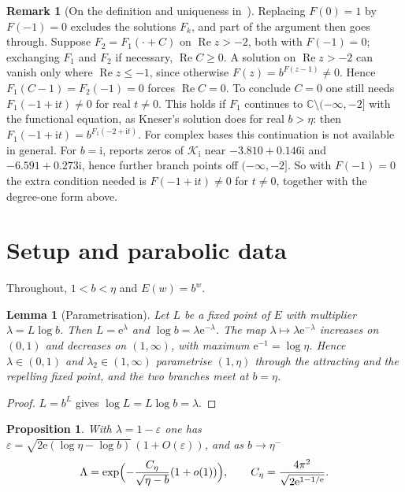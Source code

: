 \documentclass[11pt]{amsart}
\newtheorem{proposition}[theorem]{Proposition}
\newtheorem{lemma}[theorem]{Lemma}
\theoremstyle{definition}
\newtheorem{remark}[theorem]{Remark}
\newcommand{\eee}{\mathrm{e}}
\newcommand{\ii}{\mathrm{i}}
\begin{document}
\begin{remark}[On the definition and uniqueness in~\cite{Paulsen2019}]
Replacing $F(0)=1$ by $F(-1)=0$ excludes the solutions $F_k$, and part of the
argument then goes through.  Suppose $F_2=F_1(\cdot+C)$ on $\operatorname{Re}z>-2$,
both with $F(-1)=0$; exchanging $F_1$ and $F_2$ if necessary, $\operatorname{Re}C\ge0$.
A solution on $\operatorname{Re}z>-2$ can vanish only where $\operatorname{Re}z\le-1$, since otherwise
$F(z)=b^{F(z-1)}\ne0$.  Hence $F_1(C-1)=F_2(-1)=0$ forces $\operatorname{Re}C=0$.  To
conclude $C=0$ one still needs $F_1(-1+\ii t)\ne0$ for real $t\ne0$.  This holds
if $F_1$ continues to $\mathbb C\setminus(-\infty,-2]$ with the functional
equation, as Kneser's solution does for real $b>\eta$: then
$F_1(-1+\ii t)=b^{F_1(-2+\ii t)}$.  For complex bases this continuation is not
available in general.  For $b=\ii$, \cite{Paulsen2019} reports zeros of
$\mathcal K_\ii$ near $-3.810+0.146\ii$ and $-6.591+0.273\ii$, hence further branch
points off $(-\infty,-2]$.  So with $F(-1)=0$ the extra condition needed is
$F(-1+\ii t)\ne0$ for $t\ne0$, together with the degree-one form above.
\end{remark}

\section{Setup and parabolic data}\label{sec:setup}

Throughout, $1<b<\eta$ and $E(w)=b^w$.

\begin{lemma}[Parametrisation]\label{lem:param}
Let $L$ be a fixed point of $E$ with multiplier $\lambda=L\log b$.  Then
$L=\eee^\lambda$ and $\log b=\lambda\eee^{-\lambda}$.  The map
$\lambda\mapsto\lambda\eee^{-\lambda}$ increases on $(0,1)$ and decreases on
$(1,\infty)$, with maximum $\eee^{-1}=\log\eta$.  Hence $\lambda\in(0,1)$ and
$\lambda_2\in(1,\infty)$ parametrise $(1,\eta)$ through the attracting and the
repelling fixed point, and the two branches meet at $b=\eta$.
\end{lemma}

\begin{proof}
$L=b^L$ gives $\log L=L\log b=\lambda$.
\end{proof}

\begin{proposition}\label{prop:saddle}
With $\lambda=1-\varepsilon$ one has
$\varepsilon=\sqrt{2\eee(\log\eta-\log b)}\,(1+O(\varepsilon))$, and as $b\to\eta^-$
\[
 \Lambda=\exp\Bigl(-\frac{C_\eta}{\sqrt{\eta-b}}(1+o(1))\Bigr),\qquad
 C_\eta=\frac{4\pi^2}{\sqrt{2\eee^{1-1/\eee}}}.
\]
\end{proposition}
\end{document}
